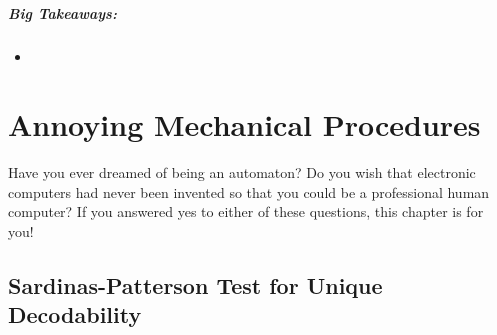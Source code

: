 \documentclass[a4paper,12pt]{report}
\begin{document}
\paragraph{Big Takeaways: } 
\begin{itemize}
\item 
\end{itemize}




















\chapter{Annoying Mechanical Procedures} 

Have you ever dreamed of being an automaton? Do you wish that electronic
computers had never been invented so that you could be a professional human
computer? If you answered yes to either of these questions, this chapter is for
you!

\section{Sardinas-Patterson Test for Unique Decodability}
\end{document}
